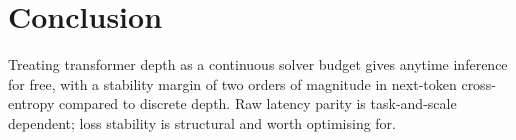 \section{Conclusion}
Treating transformer depth as a continuous solver budget gives anytime
inference for free, with a stability margin of two orders of magnitude
in next-token cross-entropy compared to discrete depth. Raw latency
parity is task-and-scale dependent; loss stability is structural and
worth optimising for.
